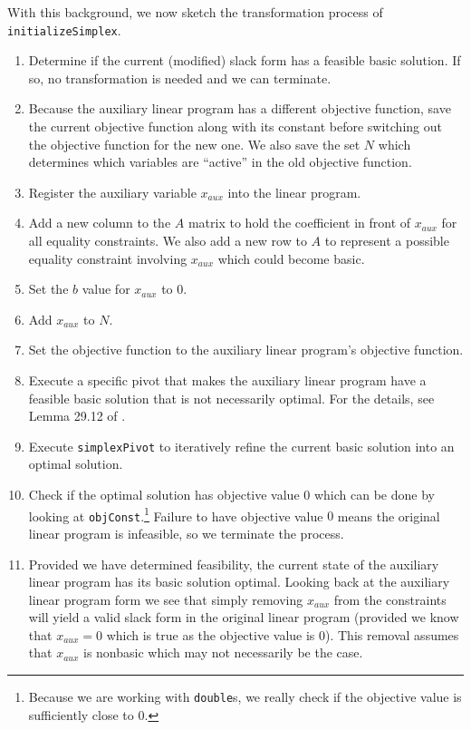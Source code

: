 \documentclass{article}
\newcommand{\javaCode}[1]{\texttt{#1}}
\begin{document}
With this background, we now sketch the transformation process of \javaCode{initializeSimplex}.
\begin{enumerate}
    \item Determine if the current (modified) slack form has a feasible basic solution. If so, no transformation is needed and we can terminate.
    \item Because the auxiliary linear program has a different objective function, save the current objective function along with its constant before switching out the objective function for the new one. We also save the set $N$ which determines which variables are ``active'' in the old objective function.
    \item Register the auxiliary variable $x_{aux}$ into the linear program.
    \item Add a new column to the $A$ matrix to hold the coefficient in front of $x_{aux}$ for all equality constraints. We also add a new row to $A$ to represent a possible equality constraint involving $x_{aux}$ which could become basic. 
    \item Set the $b$ value for $x_{aux}$ to $0$.
    \item Add $x_{aux}$ to $N$.
    \item Set the objective function to the auxiliary linear program's objective function.
    \item Execute a specific pivot that makes the auxiliary linear program have a feasible basic solution that is not necessarily optimal. For the details, see Lemma 29.12 of \cite{CLRS}.
    \item Execute \javaCode{simplexPivot} to iteratively refine the current basic solution into an optimal solution.
    \item Check if the optimal solution has objective value $0$ which can be done by looking at \javaCode{objConst}.\footnote{Because we are working with \javaCode{double}s, we really check if the objective value is sufficiently close to $0$.} Failure to have objective value $0$ means the original linear program is infeasible, so we terminate the process.
    \item Provided we have determined feasibility, the current state of the auxiliary linear program has its basic solution optimal. Looking back at the auxiliary linear program form we see that simply removing $x_{aux}$ from the constraints will yield a valid slack form in the original linear program (provided we know that $x_{aux} = 0$ which is true as the objective value is $0$). This removal assumes that $x_{aux}$ is nonbasic which may not necessarily be the case. 
    

\end{enumerate}
\end{document}
